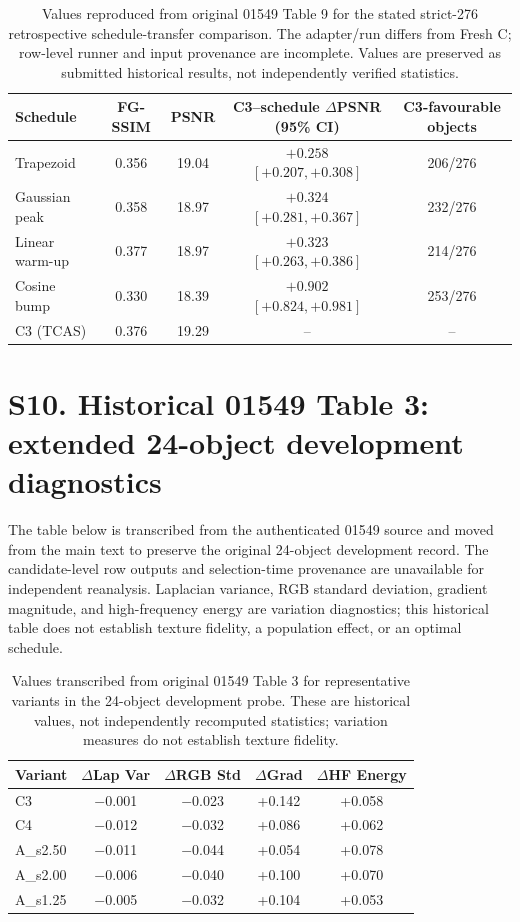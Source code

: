 \documentclass[11pt]{article}
\begin{document}
\begin{table}[ht]
\centering\small
\caption{Values reproduced from original 01549 Table 9 for the stated strict-276 retrospective schedule-transfer comparison. The adapter/run differs from Fresh C; row-level runner and input provenance are incomplete. Values are preserved as submitted historical results, not independently verified statistics.}
\label{tab:historical-table9}
\begin{tabular}{lcccc}
\toprule
Schedule & FG-SSIM & PSNR & C3--schedule $\Delta$PSNR (95\% CI) & C3-favourable objects \\
\midrule
Trapezoid & 0.356 & 19.04 & $+0.258$ $[+0.207,+0.308]$ & 206/276 \\
Gaussian peak & 0.358 & 18.97 & $+0.324$ $[+0.281,+0.367]$ & 232/276 \\
Linear warm-up & 0.377 & 18.97 & $+0.323$ $[+0.263,+0.386]$ & 214/276 \\
Cosine bump & 0.330 & 18.39 & $+0.902$ $[+0.824,+0.981]$ & 253/276 \\
C3 (TCAS) & 0.376 & 19.29 & -- & -- \\
\bottomrule
\end{tabular}
\end{table}

\section*{S10. Historical 01549 Table 3: extended 24-object development diagnostics}

The table below is transcribed from the authenticated 01549 source and moved from the main text to preserve the original 24-object development record. The candidate-level row outputs and selection-time provenance are unavailable for independent reanalysis. Laplacian variance, RGB standard deviation, gradient magnitude, and high-frequency energy are variation diagnostics; this historical table does not establish texture fidelity, a population effect, or an optimal schedule.

\begin{table}[ht]
\centering\small
\caption{Values transcribed from original 01549 Table 3 for representative variants in the 24-object development probe. These are historical values, not independently recomputed statistics; variation measures do not establish texture fidelity.}\label{tab:historical-table3}
\begin{tabular}{lcccc}
\toprule
Variant & $\Delta$Lap Var & $\Delta$RGB Std & $\Delta$Grad & $\Delta$HF Energy \\
\midrule
C3 & $-$0.001 & $-$0.023 & +0.142 & +0.058 \\
C4 & $-$0.012 & $-$0.032 & +0.086 & +0.062 \\
A\_s2.50 & $-$0.011 & $-$0.044 & +0.054 & +0.078 \\
A\_s2.00 & $-$0.006 & $-$0.040 & +0.100 & +0.070 \\
A\_s1.25 & $-$0.005 & $-$0.032 & +0.104 & +0.053 \\
\bottomrule
\end{tabular}
\end{table}
\end{document}
